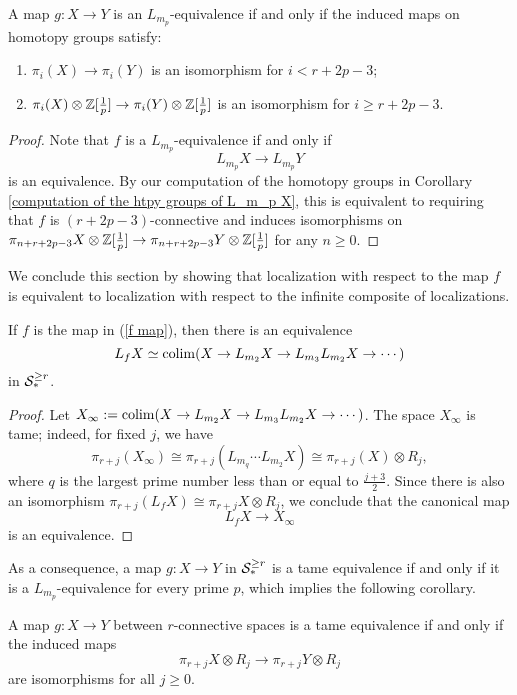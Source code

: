 \begin{corollary}
\label{Char of tame equivalence in spaces}
	A map $g:X \to Y$ is an $L_{m_p}$-equivalence if and only if the induced maps on homotopy groups satisfy:
	\begin{enumerate}
		\item  $\pi_i(X) \to \pi_i (Y)$ is an isomorphism for $i <r+2p-3$;
		\item $\pi_i(X)\otimes {\mathbb{Z}}[\frac{1}{p}] \to \pi_i(Y)\otimes {\mathbb{Z}}[\frac{1}{p}]$ is an isomorphism for $i \geq r+2p-3$.
	\end{enumerate}
\end{corollary}
\begin{proof}
Note that $f$ is a $L_{m_p}$-equivalence if and only if  
$$
L_{m_p}X \to L_{m_p}Y
$$
is an equivalence. By our computation of the homotopy groups in Corollary \ref{computation of the htpy groups of L_m_p X}, this is equivalent to requiring that $f$ is $(r+2p-3)$-connective and induces isomorphisms on 
	$
	\pi_{n+r+2p-3}X\otimes {\mathbb{Z}}[\frac{1}{p}]\to \pi_{n+r+2p-3}Y\otimes {\mathbb{Z}}[\frac{1}{p}]
	$
	for any $n\geq 0$.

\end{proof}

We conclude this section by showing that localization with respect to the map $f$ is equivalent to localization with respect to the infinite composite of localizations.
\begin{proposition}
	\label{Characterization of tame localization}
	If $f$ is the map in (\ref{f map}), then there is an equivalence
	\[
	L_f X \simeq \operatorname{colim}(X\to L_{m_2}X\to L_{m_3}L_{m_2}X\to \cdots)
	\]	
	in ${\mathcal{S}}^{\geq r}_*$. 
\end{proposition}
\begin{proof}
	Let $X_{\infty}:=\operatorname{colim}(X\to L_{m_2}X\to L_{m_3}L_{m_2}X\to \cdots)$. 
	The space $X_\infty$ is tame; indeed, for fixed $j$, we have
	\[
	\pi_{r+j}(X_{\infty})\cong \pi_{r+j}(L_{m_q}\cdots L_{m_2}X)\cong \pi_{r+j}(X) \otimes R_{j},
	\]
	where $q$ is the largest prime number less than or equal to $\frac{j+3}{2}$. 
	Since there is also an isomorphism $\pi_{r+j}(L_f X)\cong \pi_{r+j}X\otimes R_j$, we conclude that the canonical map
	$$
	L_f X \to X_{\infty}
	$$
	is an equivalence.

\end{proof}
As a consequence, a map $g: X\to Y$ in ${\mathcal{S}}^{\geq r}_{*}$ is a tame equivalence if and only if it is a $L_{m_p}$-equivalence for every prime $p$, which implies the following corollary.
\begin{corollary}
\label{char of tame equivalences for spaces}
        A map $g: X\to Y$ between $r$-connective spaces is a tame equivalence if and only if the induced maps
        $$
        \pi_{r+j}X \otimes R_{j} 
        \to
        \pi_{r+j}Y \otimes R_{j}
        $$
        are isomorphisms for all $j\geq 0$.
\end{corollary}

